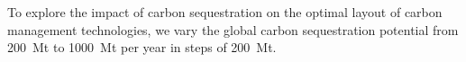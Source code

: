 To explore the impact of carbon sequestration on the optimal layout of carbon management technologies, we vary the global carbon sequestration potential from 200~Mt to 1000~Mt per year in steps of 200~Mt.














